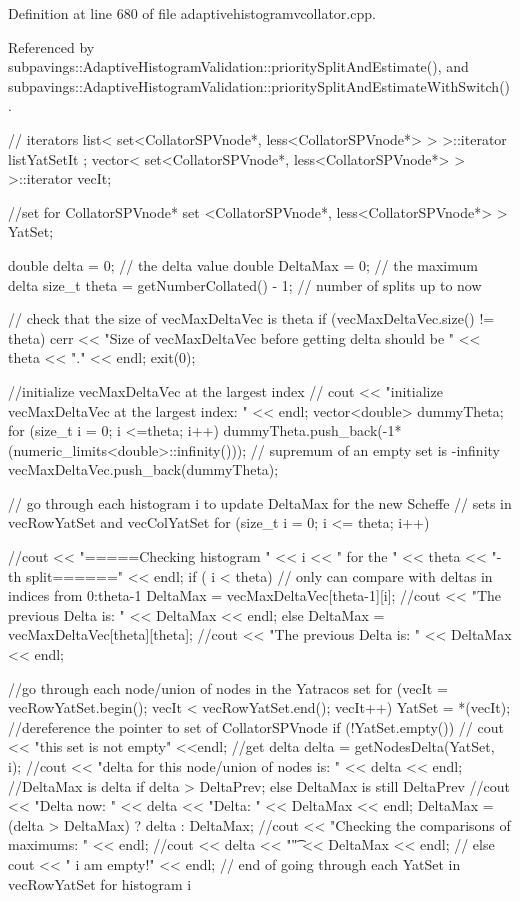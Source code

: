 \-Definition at line 680 of file adaptivehistogramvcollator.\-cpp.



\-Referenced by subpavings\-::\-Adaptive\-Histogram\-Validation\-::priority\-Split\-And\-Estimate(), and subpavings\-::\-Adaptive\-Histogram\-Validation\-::priority\-Split\-And\-Estimate\-With\-Switch().


\begin{DoxyCode}
{
  // iterators
  list< set<CollatorSPVnode*, less<CollatorSPVnode*> > >::iterator listYatSetIt
      ;
  vector< set<CollatorSPVnode*, less<CollatorSPVnode*> > >::iterator vecIt;
  
  //set for CollatorSPVnode*
  set <CollatorSPVnode*, less<CollatorSPVnode*> > YatSet; 
  
  double delta = 0; // the delta value
  double DeltaMax = 0; // the maximum delta
  size_t theta = getNumberCollated() - 1;  // number of splits up to now
   
    // check that the size of vecMaxDeltaVec is theta   
  if (vecMaxDeltaVec.size() != theta) {
    cerr << "Size of vecMaxDeltaVec before getting delta should be " << theta 
         << "." << endl;
    exit(0);
  }

  //initialize vecMaxDeltaVec at the largest index
//  cout << "initialize vecMaxDeltaVec at the largest index: " << endl;
  vector<double> dummyTheta;
  for (size_t i = 0; i <=theta; i++) {
    dummyTheta.push_back(-1*(numeric_limits<double>::infinity())); // supremum
       of an empty set is -infinity
  }
  vecMaxDeltaVec.push_back(dummyTheta);

    // go through each histogram i to update DeltaMax for the new Scheffe 
    // sets in vecRowYatSet and vecColYatSet 
    for (size_t i = 0; i <= theta; i++) {
      //cout << "\n =====Checking histogram  " << i << " for the " << theta <<
       "-th split======" << endl;
      if ( i < theta) { // only can compare with deltas in indices from
       0:theta-1
        DeltaMax = vecMaxDeltaVec[theta-1][i];
        //cout << "The previous Delta is: " << DeltaMax << endl;
      }
      else {
        DeltaMax = vecMaxDeltaVec[theta][theta];
        //cout << "The previous Delta is: " << DeltaMax << endl;  
      }

      //go through each node/union of nodes in the Yatracos set
      for (vecIt = vecRowYatSet.begin(); vecIt < vecRowYatSet.end(); vecIt++){
        YatSet = *(vecIt); //dereference the pointer to set of CollatorSPVnode
           if (!YatSet.empty()) {
          //  cout << "this set is not empty" <<endl;
            //get delta
              delta = getNodesDelta(YatSet, i);
            //cout << "delta for this node/union of nodes is: " << delta <<
       endl;
            //DeltaMax is delta if delta > DeltaPrev; else DeltaMax is still
       DeltaPrev
            //cout << "Delta now: " << delta << "\tPrev Delta: " << DeltaMax <<
       endl;
            DeltaMax = (delta > DeltaMax) ? delta : DeltaMax; 
            //cout << "Checking the comparisons of maximums: " << endl;
            //cout << delta << "\t" << DeltaMax << endl;
          }
      //   else { cout << " i am empty!" << endl; } 
      } // end of going through each YatSet in vecRowYatSet for histogram i

}}
\end{DoxyCode}
